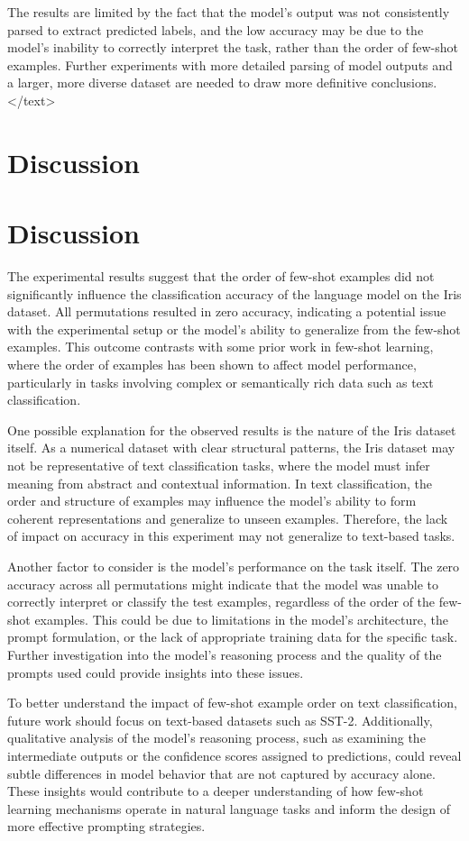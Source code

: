 \documentclass{article}
\begin{document}
The results are limited by the fact that the model's output was not consistently parsed to extract predicted labels, and the low accuracy may be due to the model's inability to correctly interpret the task, rather than the order of few-shot examples. Further experiments with more detailed parsing of model outputs and a larger, more diverse dataset are needed to draw more definitive conclusions.
</text>
\section{Discussion}
\section{Discussion}

The experimental results suggest that the order of few-shot examples did not significantly influence the classification accuracy of the language model on the Iris dataset. All permutations resulted in zero accuracy, indicating a potential issue with the experimental setup or the model's ability to generalize from the few-shot examples. This outcome contrasts with some prior work in few-shot learning, where the order of examples has been shown to affect model performance, particularly in tasks involving complex or semantically rich data such as text classification.

One possible explanation for the observed results is the nature of the Iris dataset itself. As a numerical dataset with clear structural patterns, the Iris dataset may not be representative of text classification tasks, where the model must infer meaning from abstract and contextual information. In text classification, the order and structure of examples may influence the model's ability to form coherent representations and generalize to unseen examples. Therefore, the lack of impact on accuracy in this experiment may not generalize to text-based tasks.

Another factor to consider is the model's performance on the task itself. The zero accuracy across all permutations might indicate that the model was unable to correctly interpret or classify the test examples, regardless of the order of the few-shot examples. This could be due to limitations in the model's architecture, the prompt formulation, or the lack of appropriate training data for the specific task. Further investigation into the model's reasoning process and the quality of the prompts used could provide insights into these issues.

To better understand the impact of few-shot example order on text classification, future work should focus on text-based datasets such as SST-2. Additionally, qualitative analysis of the model's reasoning process, such as examining the intermediate outputs or the confidence scores assigned to predictions, could reveal subtle differences in model behavior that are not captured by accuracy alone. These insights would contribute to a deeper understanding of how few-shot learning mechanisms operate in natural language tasks and inform the design of more effective prompting strategies.
\end{document}
